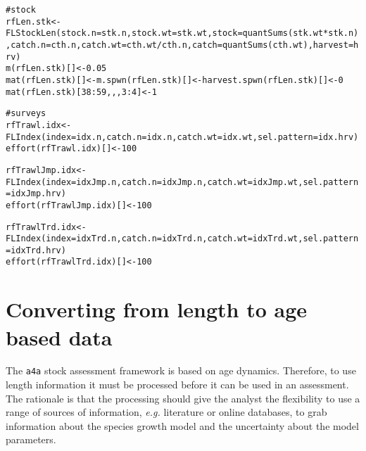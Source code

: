 \documentclass[a4paper,english,10pt]{article}\usepackage[]{graphicx}\usepackage[]{color}
\makeatletter
\newcommand{\hlnum}[1]{\textcolor[rgb]{0.2,0.2,0.2}{#1}}%
\newcommand{\hlcom}[1]{\textcolor[rgb]{0.2,0.267,0.4}{#1}}%
\newcommand{\hlopt}[1]{\textcolor[rgb]{0.2,0.2,0.2}{#1}}%
\newcommand{\hlstd}[1]{\textcolor[rgb]{0,0,0}{#1}}%
\newcommand{\hlkwb}[1]{\textcolor[rgb]{0.361,0.506,0.596}{#1}}%
\newcommand{\hlkwc}[1]{\textcolor[rgb]{0.361,0.506,0.596}{#1}}%
\newcommand{\hlkwd}[1]{\textcolor[rgb]{0.361,0.506,0.596}{#1}}%
\newenvironment{kframe}{%
 \def\at@end@of@kframe{}%
 \ifinner\ifhmode%
  \def\at@end@of@kframe{\end{minipage}}%
  \begin{minipage}{\columnwidth}%
 \fi\fi%
 \def\FrameCommand##1{\hskip\@totalleftmargin \hskip-\fboxsep
 \colorbox{shadecolor}{##1}\hskip-\fboxsep
     \hskip-\linewidth \hskip-\@totalleftmargin \hskip\columnwidth}%
 \MakeFramed {\advance\hsize-\width
   \@totalleftmargin\z@ \linewidth\hsize
   \@setminipage}}%
 {\par\unskip\endMakeFramed%
 \at@end@of@kframe}
\newenvironment{knitrout}{}{} %
\newcommand{\initiative}[1]{{\texttt{#1}}}
\makeatother
\begin{document}
\begin{knitrout}
\color{fgcolor}\begin{kframe}
\begin{alltt}
\hlcom{# stock}
\hlstd{rfLen.stk} \hlkwb{<-} \hlkwd{FLStockLen}\hlstd{(}\hlkwc{stock.n}\hlstd{=stk.n,} \hlkwc{stock.wt}\hlstd{=stk.wt,} \hlkwc{stock}\hlstd{=}\hlkwd{quantSums}\hlstd{(stk.wt}\hlopt{*}\hlstd{stk.n),} \hlkwc{catch.n}\hlstd{=cth.n,} \hlkwc{catch.wt}\hlstd{=cth.wt}\hlopt{/}\hlstd{cth.n,} \hlkwc{catch}\hlstd{=}\hlkwd{quantSums}\hlstd{(cth.wt),} \hlkwc{harvest}\hlstd{=hrv)}
\hlkwd{m}\hlstd{(rfLen.stk)[]} \hlkwb{<-} \hlnum{0.05}
\hlkwd{mat}\hlstd{(rfLen.stk)[]} \hlkwb{<-} \hlkwd{m.spwn}\hlstd{(rfLen.stk)[]} \hlkwb{<-} \hlkwd{harvest.spwn}\hlstd{(rfLen.stk)[]} \hlkwb{<-} \hlnum{0}
\hlkwd{mat}\hlstd{(rfLen.stk)[}\hlnum{38}\hlopt{:}\hlnum{59}\hlstd{,,,}\hlnum{3}\hlopt{:}\hlnum{4}\hlstd{]} \hlkwb{<-} \hlnum{1}

\hlcom{# surveys}
\hlstd{rfTrawl.idx} \hlkwb{<-} \hlkwd{FLIndex}\hlstd{(}\hlkwc{index}\hlstd{=idx.n,} \hlkwc{catch.n}\hlstd{=idx.n,} \hlkwc{catch.wt}\hlstd{=idx.wt,} \hlkwc{sel.pattern}\hlstd{=idx.hrv)}
\hlkwd{effort}\hlstd{(rfTrawl.idx)[]} \hlkwb{<-} \hlnum{100}

\hlstd{rfTrawlJmp.idx} \hlkwb{<-} \hlkwd{FLIndex}\hlstd{(}\hlkwc{index}\hlstd{=idxJmp.n,} \hlkwc{catch.n}\hlstd{=idxJmp.n,} \hlkwc{catch.wt}\hlstd{=idxJmp.wt,} \hlkwc{sel.pattern}\hlstd{=idxJmp.hrv)}
\hlkwd{effort}\hlstd{(rfTrawlJmp.idx)[]} \hlkwb{<-} \hlnum{100}

\hlstd{rfTrawlTrd.idx} \hlkwb{<-} \hlkwd{FLIndex}\hlstd{(}\hlkwc{index}\hlstd{=idxTrd.n,} \hlkwc{catch.n}\hlstd{=idxTrd.n,} \hlkwc{catch.wt}\hlstd{=idxTrd.wt,} \hlkwc{sel.pattern}\hlstd{=idxTrd.hrv)}
\hlkwd{effort}\hlstd{(rfTrawlTrd.idx)[]} \hlkwb{<-} \hlnum{100}
\end{alltt}
\end{kframe}
\end{knitrout}

\pagebreak
\section{Converting from length to age based data}\label{sec:l2a}

The \initiative{a4a} stock assessment framework is based on age dynamics. Therefore, to use length information it must be processed before it can be used in an assessment. The rationale is that the processing should give the analyst the flexibility to use a range of sources of information, \emph{e.g.} literature or online databases, to grab information about the species growth model and the uncertainty about the model parameters.
\end{document}
